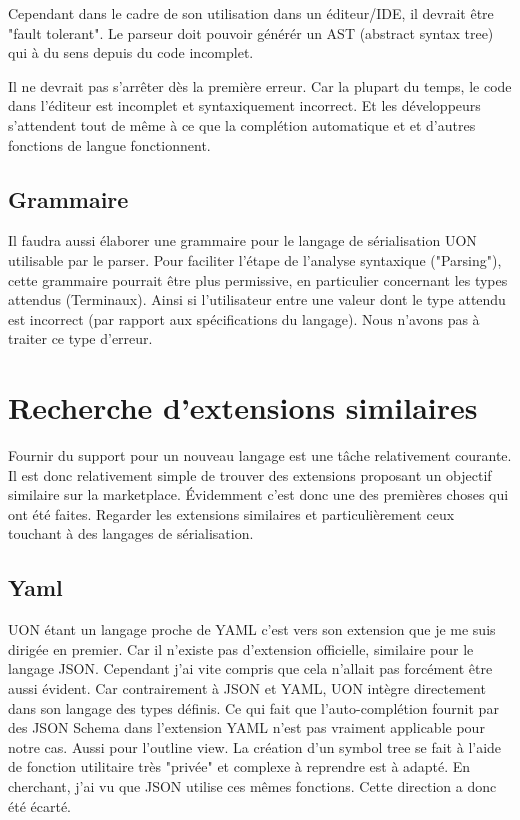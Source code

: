 \documentclass[
    iict, %
    il, %
]{heig-tb}
\begin{document}
Cependant dans le cadre de son utilisation dans un éditeur/IDE, il devrait être "fault tolerant". Le parseur doit pouvoir générér un AST (abstract syntax tree) qui à du sens depuis du code incomplet.

Il ne devrait pas s'arrêter dès la première erreur. Car la plupart du temps, le code dans l'éditeur est incomplet et syntaxiquement incorrect.
Et les développeurs s'attendent tout de même à ce que la complétion automatique et et d'autres fonctions de langue fonctionnent.

\subsection{Grammaire}
Il faudra aussi élaborer une grammaire pour le langage de sérialisation UON utilisable par le parser.
Pour faciliter l'étape de l'analyse syntaxique ("Parsing"), cette grammaire pourrait être plus permissive, en particulier concernant les types attendus (Terminaux). Ainsi si l'utilisateur entre une valeur dont le type attendu est incorrect (par rapport aux spécifications du langage). Nous n'avons pas à traiter ce type d'erreur.

\section{Recherche d'extensions similaires}
Fournir du support pour un nouveau langage est une tâche relativement courante.
Il est donc relativement simple de trouver des extensions proposant un objectif similaire sur la marketplace.
Évidemment c'est donc une des premières choses qui ont été faites. Regarder les extensions similaires et particulièrement ceux touchant à des langages de sérialisation.

\subsection{Yaml}
UON étant un langage proche de YAML c'est vers son extension que je me suis dirigée en premier. Car il n'existe pas d'extension officielle, similaire pour le langage JSON.
Cependant j'ai vite compris que cela n'allait pas forcément être aussi évident. Car contrairement à JSON et YAML, UON intègre directement dans son langage des types définis. Ce qui fait que l'auto-complétion fournit par des JSON Schema dans l'extension YAML n'est pas vraiment applicable pour notre cas.
Aussi pour l'outline view. La création d'un symbol tree se fait à l'aide de fonction utilitaire très "privée" et complexe à reprendre est à adapté. En cherchant, j'ai vu que JSON utilise ces mêmes fonctions.
Cette direction a donc été écarté.
\end{document}
